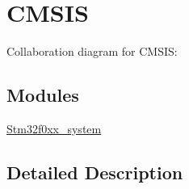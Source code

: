 \hypertarget{group___c_m_s_i_s}{}\section{C\+M\+S\+IS}
\label{group___c_m_s_i_s}
Collaboration diagram for C\+M\+S\+IS\+:
\subsection*{Modules}
\begin{DoxyCompactItemize}
\item 
\hyperlink{group__stm32f0xx__system}{Stm32f0xx\+\_\+system}
\end{DoxyCompactItemize}


\subsection{Detailed Description}
